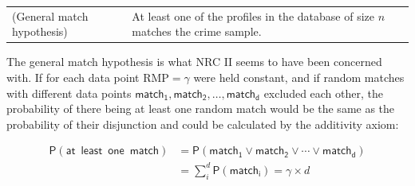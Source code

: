 \documentclass[10pt,dvipsnames,enabledeprecatedfontcommands]{scrartcl}
\newcommand{\pr}[1]{\mathsf{P}(#1)}
\begin{document}
\begin{tabular}{lp{8cm}}
(General match hypothesis) &
At least one of the profiles in the database of size $n$ 
matches the crime sample.
\end{tabular}

\vspace{1mm} \noindent The general match hypothesis is what NRC II seems
to have been concerned with. If for each data point RMP\(=\gamma\) were
held constant, and if random matches with different data points
\(\mathsf{match_1, match_2, \dots, match_d}\) excluded each other, the
probability of there being at least one random match would be the same
as the probability of their disjunction and could be calculated by the
additivity axiom:

\begin{align*}
\pr{\mathsf{at\,\,\, least\,\,\, one\,\,\, match}} & = \pr{\mathsf{match_1} \vee \mathsf{match_2} \vee \cdots \vee \mathsf{match_d}} \\
& = \sum_{i}^d \pr{\mathsf{match_i}} = \gamma \times d
\end{align*}
\end{document}
